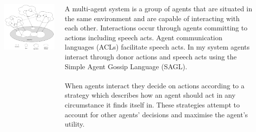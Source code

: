\documentclass[25pt,a3paper]{tikzposter}
\begin{document}
\begin{columns}
{\begin{minipage}{22cm}
\begin{framed}
			\includegraphics[width=\textwidth]{JenningsMAS.png}
		\end{framed}
	\end{minipage}
	\begin{minipage}{16cm}
		A multi-agent system is a group of agents that are situated in the same environment and are capable of interacting with each other. Interactions occur through agents committing to actions including speech acts. Agent communication languages (ACLs) facilitate speech acts. In my system agents interact through donor actions and speech acts using the Simple Agent Gossip Language (SAGL).\\\\
		When agents interact they decide on actions according to a strategy which describes how an agent should act in any circumstance it finds itself in. These strategies attempt to account for other agents' decisions and maximise the agent's utility.
	\end{minipage}
}
\end{columns}
\end{document}
